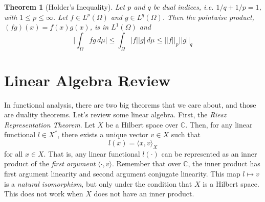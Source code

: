 \documentclass{article}
\newtheorem{theorem}{Theorem}[section]
\theoremstyle{remark}
\theoremstyle{definition}
\begin{document}
\begin{theorem}[Holder's Inequality]
Let $p$ and $q$ be dual indices, i.e. $1/q + 1/p = 1$, with $1 \leq p \leq \infty$. Let $f \in L^p(\Omega)$ and $g \in L^q (\Omega)$. Then the pointwise product, $(f g)(x) = f(x) g(x)$, is in $L^1(\Omega)$ and 
\[\bigg| \int_\Omega fg \, d\mu \bigg| \leq \int_\Omega |f| |g| \,d\mu \leq ||f||_p ||g||_q\]
\end{theorem}

\section{Linear Algebra Review}
In functional analysis, there are two big theorems that we care about, and those are duality theorems. Let's review some linear algebra. First, the \textit{Riesz Representation Theorem}. Let $X$ be a Hilbert space over $\mathbb{C}$. Then, for any linear functional $l \in X^*$, there exists a unique vector $v \in X$ such that 
\[l(x) = \langle x, v \rangle_X\]
for all $x \in X$. That is, any linear functional $l(\cdot)$ can be represented as an inner product of the \textit{first argument} $\langle \cdot , v \rangle$. Remember that over $\mathbb{C}$, the inner product has first argument linearity and second argument conjugate linearity. This map $l \mapsto v$ is a \textit{natural isomorphism}, but only under the condition that $X$ is a Hilbert space. This does not work when $X$ does not have an inner product. 
\end{document}
